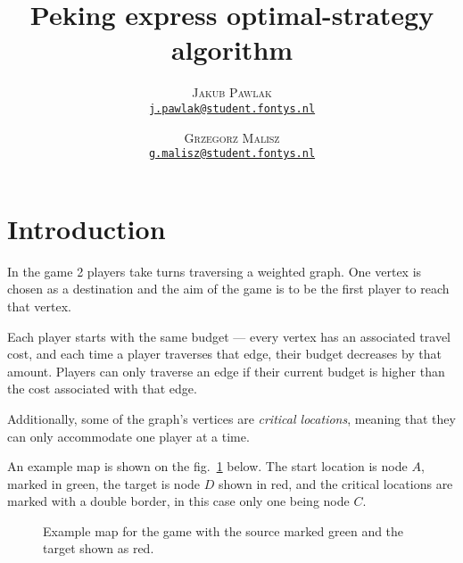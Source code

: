 \documentclass[12pt]{article}
\author{
    \textsc{Jakub Pawlak}\\
    \href{mailto:j.pawlak@student.fontys.nl}{\texttt{j.pawlak@student.fontys.nl}}
    \and 
    \textsc{Grzegorz Malisz}\\
    \href{mailto:g.malisz@student.fontys.nl}{\texttt{g.malisz@student.fontys.nl}}
}
\title{\sffamily\bfseries\Huge Peking express optimal-strategy algorithm}
\begin{document}
\begin{titlepage}
    \maketitle
    \thispagestyle{empty}
    \tableofcontents
    \restoregeometry
\end{titlepage}
\setcounter{page}{2}

\section{Introduction}

In the game 2 players take turns traversing a weighted graph.
One vertex is chosen as a destination and the aim of the game is to be the first player to reach that vertex.

Each player starts with the same budget --- every vertex has an associated travel cost, and each time a player traverses that edge, their budget decreases by that amount.
Players can only traverse an edge if their current budget is higher than the cost associated with that edge.

Additionally, some of the graph's vertices are \emph{critical locations}, meaning that they can only accommodate one player at a time.

An example map is shown on the fig.~\ref*{fig:example-map} below.
The start location is node $A$, marked in green, the target is node $D$ shown in red,
and the critical locations are marked with a double border, in this case only one being node $C$.

\begin{figure}[H]\centering
    \caption{Example map for the game with the source marked green and the target shown as red.}
    \label{fig:example-map}
\end{figure}
\end{document}
